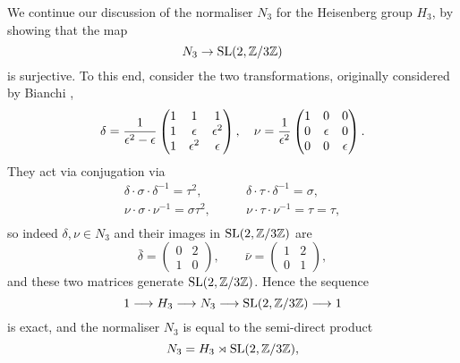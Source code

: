 We continue our discussion of the normaliser $N_{3}$ for the Heisenberg group $H_{3}$, by showing that the map
\begin{equation*}
	N_{3} \rightarrow \operatorname{SL}(2,\mathbb{Z}/3\mathbb{Z})
\end{equation*}
is surjective. To this end, consider the two transformations, originally considered by Bianchi \cite{Bianchi_1880},
\begin{equation}
\label{hesse_transform}
	\delta =
	\frac{1}{\epsilon^{2} - \epsilon}\begin{pmatrix}
	1 & 1 & 1 \\
	1 & \epsilon & \epsilon^{2}\\
	1 & \epsilon^{2} & \epsilon
	\end{pmatrix},
	\quad
	\nu =
	\frac{1}{\epsilon^{2}}
	\begin{pmatrix}
	1 & 0 & 0\\
	0 & \epsilon & 0\\
	0 & 0 & \epsilon
	\end{pmatrix}.
\end{equation}
They act via conjugation via
\begin{equation*}
	\begin{split}
	\delta\cdot\sigma\cdot\delta^{-1} = \tau^{2},\qquad &\delta\cdot\tau\cdot\delta^{-1} = \sigma,\\
	\nu\cdot\sigma\cdot\nu^{-1} = \sigma\tau^{2},\qquad
	&\nu\cdot\tau\cdot\nu^{-1} = \tau = \tau,\\
	\end{split}
\end{equation*}
so indeed $\delta,\nu \in N_{3}$ and their images in $\operatorname{SL}(2,\mathbb{Z}/3\mathbb{Z})$ are
\begin{equation*}
	\bar{\delta} = \begin{pmatrix}
	0 & 2\\
	1 & 0
	\end{pmatrix},
	\qquad
	\bar{\nu} = \begin{pmatrix}
	1 & 2\\
	0 & 1
	\end{pmatrix},
\end{equation*}
and these two matrices generate $\operatorname{SL}(2,\mathbb{Z}/3\mathbb{Z})$. Hence the sequence
\begin{equation*}
	1 \longrightarrow H_{3} \longrightarrow N_{3} \longrightarrow \operatorname{SL}(2,\mathbb{Z}/3\mathbb{Z}) \longrightarrow 1
\end{equation*}
is exact, and the normaliser $N_{3}$ is equal to the semi-direct product \cite{Horrocks_1973}
\begin{equation*}
	N_{3} = H_{3} \rtimes \operatorname{SL}(2,\mathbb{Z}/3\mathbb{Z}),
\end{equation*}
